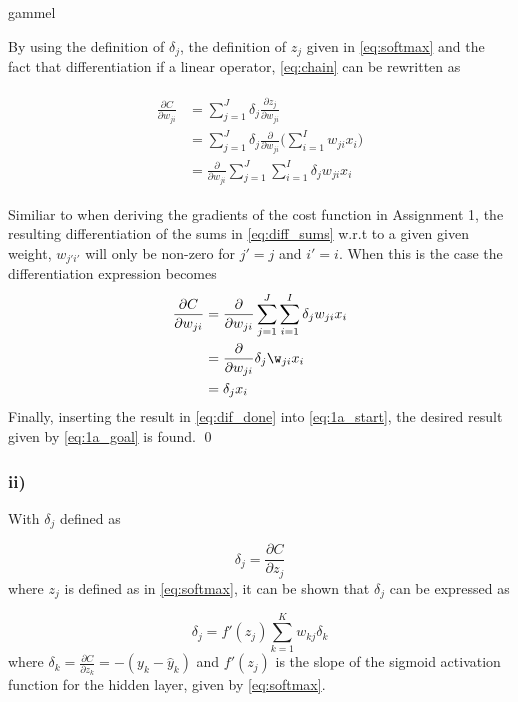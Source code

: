 \documentclass{article}
\begin{document}
gammel

By using the definition of $\delta_j$, the definition of $z_j$ given in \eqref{eq:softmax} and the fact that differentiation if a linear operator, \eqref{eq:chain} can be rewritten as

\begin{align}
\begin{split}
         \frac{\partial C}{\partial w_{ji}} &= \sum_{j=1}^J \delta_j \frac{\partial z_j}{\partial w_{ji}} \\
         &= \sum_{j=1}^J \delta_j \frac{\partial}{\partial w_{ji}} \bigg( \sum_{i = 1}^I w_{ji}x_i \bigg) \\
         &= \frac{\partial}{\partial w_{ji}} \sum_{j=1}^J \sum_{i = 1}^I \delta_j w_{ji}x_i
\end{split}
\label{eq:diff_sums}
\end{align}

Similiar to when deriving the gradients of the cost function in Assignment 1, the resulting differentiation of the sums in \eqref{eq:diff_sums} w.r.t to a given given weight, $w_{j'i'}$ will only be non-zero for $j' = j$ and $i' = i$. When this is the case the differentiation expression becomes 
\begin{align}
\begin{split}
    \frac{\partial C}{\partial w_{ji}} &= \frac{\partial}{\partial w_{ji}} \sum_{j=1}^J \sum_{i = 1}^I \delta_j w_{ji}x_i \\
    &= \frac{\partial}{\partial w_{ji}} \delta_j \w_{ji}x_i \\
    &= \delta_jx_i
\end{split}
\label{eq:dif_done}
\end{align}
Finally, inserting the result in \eqref{eq:dif_done} into \eqref{eq:1a_start}, the desired result given by \eqref{eq:1a_goal} is found. \qed

\subsubsection*{ii)}

With $\delta_j$ defined as

\begin{equation}
\delta_j = \frac{\partial C}{\partial z_j}
    \label{eq:deltaj}
\end{equation}
where $z_j$ is defined as in \eqref{eq:softmax}, it can be shown that $\delta_j$ can be expressed as

\begin{equation}
    \delta_j = f'(z_j)  \sum_{k=1}^K w_{kj} \delta_k
\end{equation}
where $\delta_k = \frac{\partial C}{\partial z_k} = -(y_k - \hat{y}_k)$ and $f'(z_j)$ is the slope of the sigmoid activation function for the hidden layer, given by \eqref{eq:softmax}.
\end{document}
